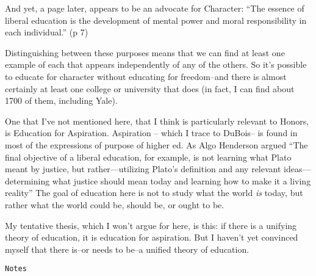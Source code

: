 And yet, a page later, appears to be an advocate for Character: ``The essence of liberal education is the development of mental power and moral responsibility in each individual.'' (p 7) 

Distinguishing between these purposes means that we can find at least one example of each that appears independently of any of the others. So it's possible to educate for character without educating for freedom--and there is almost certainly at least one college or university that does (in fact, I can find about 1700 of them, including Yale).

One that I've not mentioned here, that I think is particularly relevant to Honors, is Education for Aspiration. Aspiration -- which I trace to DuBois-- is found in most of the expressions of purpose of higher ed. As Algo Henderson argued ``The final objective of a liberal education, for example, is not learning what Plato meant by justice, but rather---utilizing Plato's definition and any relevant ideas---determining what justice should mean today and learning how to make it a living reality'' The goal of education here is not to study what the world \emph{is} today, but rather what the world could be, should be, or ought to be.

My tentative thesis, which I won't argue for here, is this: if there is a unifying theory of education, it is education for aspiration. But I haven't yet convinced myself that there is--or needs to be--a unified theory of education.

\begin{verbatim}
Notes
\end{verbatim}


\backmatter
\printindex
%
%
\printbibliography



